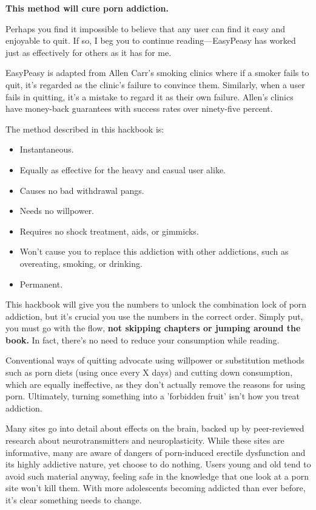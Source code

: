 \documentclass[easypeasy.tex]{subfiles}
\begin{document}
{\large\bfseries This method will cure porn addiction.}

Perhaps you find it impossible to believe that any user can find it easy and enjoyable to quit. If so, I beg you to continue reading—EasyPeasy has worked just as effectively for others as it has for me.

EasyPeasy is adapted from Allen Carr's smoking clinics where if a smoker fails to quit, it's regarded as the clinic's failure to convince them. Similarly, when a user fails in quitting, it's a mistake to regard it as their own failure. Allen's clinics have money-back guarantees with success rates over ninety-five percent.

The method described in this hackbook is:
\begin{itemize}
  \item Instantaneous.
  \item Equally as effective for the heavy and casual user alike.
  \item Causes no bad withdrawal pangs.
  \item Needs no willpower.
  \item Requires no shock treatment, aids, or gimmicks.
  \item Won't cause you to replace this addiction with other addictions, such as overeating, smoking, or drinking.
  \item Permanent.
\end{itemize}

This hackbook will give you the numbers to unlock the combination lock of porn addiction, but it's crucial you use the numbers in the correct order. Simply put, you must go with the flow, \textbf{not skipping chapters or jumping around the book.} In fact, there's no need to reduce your consumption while reading.

Conventional ways of quitting advocate using willpower or substitution methods such as porn diets (using once every X days) and cutting down consumption, which are equally ineffective, as they don't actually remove the reasons for using porn. Ultimately, turning something into a 'forbidden fruit' isn't how you treat addiction.

Many sites go into detail about effects on the brain, backed up by peer-reviewed research about neurotransmitters and neuroplasticity. While these sites are informative, many are aware of dangers of porn-induced erectile dysfunction and its highly addictive nature, yet choose to do nothing. Users young and old tend to avoid such material anyway, feeling safe in the knowledge that one look at a porn site won't kill them. With more adolescents becoming addicted than ever before, it's clear something needs to change.
\end{document}
